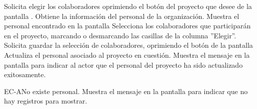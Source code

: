 	\begin{UCtrayectoria}
		\UCpaso[\UCactor] Solicita elegir los colaboradores oprimiendo el botón  del proyecto que desee de la pantalla .
		\UCpaso[\UCsist] Obtiene la información del personal de la organización. 
		\UCpaso[\UCsist] Muestra el personal encontrado en la pantalla 
		\UCpaso[\UCactor] Selecciona los colaboradores que participarán en el proyecto, marcando o desmarcando las casillas de la columna ''Elegir''.
		\UCpaso[\UCactor] Solicita guardar la selección de colaboradores, oprimiendo el botón  de la pantalla 
		\UCpaso[\UCsist] Actualiza el personal asociado al proyecto en cuestión.
		\UCpaso[\UCsist] Muestra el mensaje  en la pantalla  para indicar al actor que el personal del proyecto ha sido actualizado exitosamente.
	\end{UCtrayectoria}		
		\begin{UCtrayectoriaA}{EC-A}{No existe personal.}
			\UCpaso[\UCsist] Muestra el mensaje  en la pantalla  para indicar que no hay registros para mostrar.
		\end{UCtrayectoriaA}

